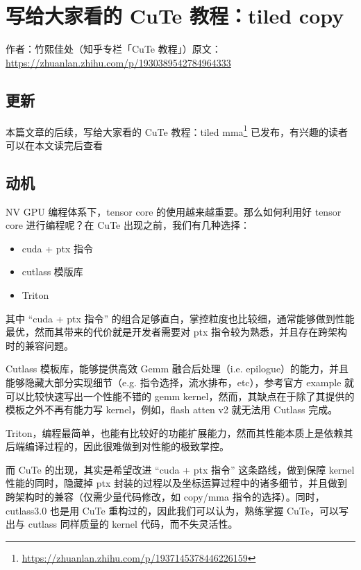 \chapter{写给大家看的 CuTe 教程：tiled copy}

\begin{center}\small 作者：竹熙佳处（知乎专栏「CuTe 教程」）\quad 原文：\url{https://zhuanlan.zhihu.com/p/1930389542784964333}\end{center}

\section{更新}

本篇文章的后续，写给大家看的 CuTe 教程：tiled mma\footnote{\url{https://zhuanlan.zhihu.com/p/1937145378446226159}} 已发布，有兴趣的读者可以在本文读完后查看

\section{动机}

NV GPU 编程体系下，tensor core 的使用越来越重要。那么如何利用好 tensor core 进行编程呢？在 CuTe 出现之前，我们有几种选择：

\begin{itemize}
  \item cuda + ptx 指令
  \item cutlass 模版库
  \item Triton
\end{itemize}

其中 “cuda + ptx 指令” 的组合足够直白，掌控粒度也比较细，通常能够做到性能最优，然而其带来的代价就是开发者需要对 ptx 指令较为熟悉，并且存在跨架构时的兼容问题。

Cutlass 模板库，能够提供高效 Gemm 融合后处理（i.e. epilogue）的能力，并且能够隐藏大部分实现细节（e.g. 指令选择，流水排布，etc），参考官方 example 就可以比较快速写出一个性能不错的 gemm kernel，然而，其缺点在于除了其提供的模板之外不再有能力写 kernel，例如，flash atten v2 就无法用 Cutlass 完成。

Triton，编程最简单，也能有比较好的功能扩展能力，然而其性能本质上是依赖其后端编译过程的，因此很难做到对性能的极致掌控。

而 CuTe 的出现，其实是希望改进 “cuda + ptx 指令” 这条路线，做到保障 kernel 性能的同时，隐藏掉 ptx 封装的过程以及坐标运算过程中的诸多细节，并且做到跨架构时的兼容（仅需少量代码修改，如 copy/mma 指令的选择）。同时，cutlass3.0 也是用 CuTe 重构过的，因此我们可以认为，熟练掌握 CuTe，可以写出与 cutlass 同样质量的 kernel 代码，而不失灵活性。

